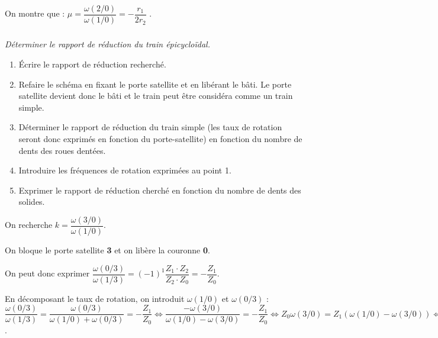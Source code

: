 \documentclass[10pt,fleqn]{article} %
\begin{document}
On montre que : $\mu = \dfrac{\omega(2/0)}{\omega(1/0)}=-\dfrac{r_1}{2r_2}$ .

\subparagraph{}
\textit{Déterminer le rapport de réduction du train épicycloïdal.}
\ifprof
\begin{corrige}
\begin{methode}
\begin{enumerate}
\item Écrire le rapport de réduction recherché.
\item Refaire le schéma en fixant le porte satellite et en libérant le bâti. Le porte satellite devient donc le bâti et le train peut être considéra comme un train simple.
\item Déterminer le rapport de réduction du train simple (les taux de rotation seront donc exprimés en fonction du porte-satellite) en fonction du nombre de dents des roues dentées.
\item Introduire les fréquences de rotation exprimées au point 1.
\item Exprimer le rapport de réduction cherché en fonction du  nombre de dents des solides. 
\end{enumerate}
\end{methode}


\begin{minipage}[c]{.6\linewidth}
On recherche $k=\dfrac{\omega(3/0)}{\omega(1/0)}$. 

On bloque le porte satellite \textbf{3} et on libère la couronne \textbf{0}. 

On peut donc exprimer $ \dfrac{\omega(0/3)}{\omega(1/3)} = (-1)^1\dfrac{Z_1\cdot Z_2}{Z_2\cdot Z_0} = -\dfrac{Z_1}{Z_0}$.

En décomposant le taux de rotation, on introduit $\omega(1/0)$ et $\omega(0/3)$ :
$ \dfrac{\omega(0/3)}{\omega(1/3)} =  \dfrac{\omega(0/3)}{\omega(1/0)+\omega(0/3)} = -\dfrac{Z_1}{Z_0} 
\Leftrightarrow \dfrac{-\omega(3/0)}{\omega(1/0)-\omega(3/0)}  =-\dfrac{Z_1}{Z_0}  \Leftrightarrow {Z_0} \omega(3/0)  =Z_1 \left( \omega(1/0)-\omega(3/0)\right) 
\Leftrightarrow  \omega(3/0) \left(Z_0 + Z_1\right) =Z_1 \omega(1/0) 
\Leftrightarrow \dfrac{\omega(3/0)}{\omega(1/0)} = \dfrac{Z_1}{Z_1+Z_0}$.


\end{minipage}
\end{corrige}
\end{document}
